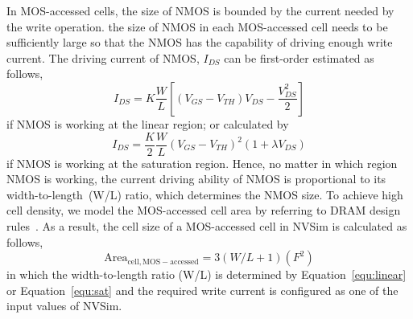 In MOS-accessed cells, the size of NMOS is bounded by the current needed by the write operation.  the size of NMOS in each MOS-accessed cell needs to be sufficiently large so that the NMOS has the capability of driving enough write current. The driving current of NMOS, $I_{DS}$ can be first-order estimated as follows,
\begin{equation}
I_{DS}=K\frac{W}{L}\left[\left(V_{GS}-V_{TH}\right)V_{DS}-\frac{V_{DS}^2}{2}\right]  \label{equ:linear}
\end{equation}
if NMOS is working at the linear region; or calculated by
\begin{equation}
I_{DS}=\frac{K}{2}\frac{W}{L}\left(V_{GS}-V_{TH}\right)^2\left(1+\lambda  \label{equ:sat}
V_{DS}\right)
\end{equation}
if NMOS is working at the saturation region.  Hence, no matter in which region NMOS is working, the current driving ability of NMOS is proportional to its width-to-length~(W/L) ratio, which determines the NMOS size.  To achieve high cell density, we model the MOS-accessed cell area by referring to DRAM design rules~\cite{DRAM:6F2}.  As a result, the cell size of a MOS-accessed cell in NVSim is calculated as follows,
\begin{equation}
\mathrm{Area}_{\mathrm{cell,MOS-accessed}}={3\left(W/L+1\right)}(F^2)
\end{equation}
in which the width-to-length ratio (W/L) is determined by Equation~\ref{equ:linear} or Equation~\ref{equ:sat} and the required write current is configured as one of the input values of NVSim. 